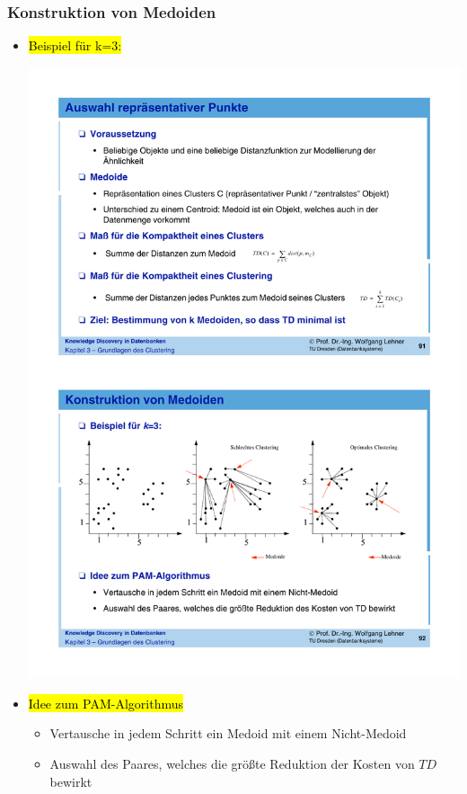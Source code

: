 \begin{frame}
\frametitle{Konstruktion von Medoiden}

\begin{itemize}
\item\hl{Beispiel für k=3:} 

\begin{center}
\includegraphics[scale=.6]{fig7/medoide.pdf}
\end{center}

\item\hl{Idee zum PAM-Algorithmus}
\begin{itemize}
\item Vertausche in jedem Schritt ein Medoid mit einem Nicht-Medoid 
\item Auswahl des Paares, welches die größte Reduktion der Kosten von
  $TD$ bewirkt  
\end{itemize}
\end{itemize}

\end{frame}

